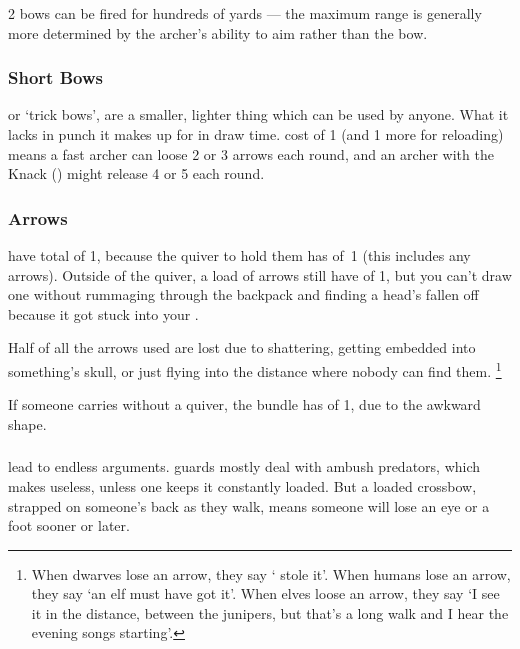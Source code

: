 \begin{multicols}{2}
\Glspl{bow} can be fired for hundreds of yards --- the maximum range is generally more determined by the archer's ability to aim rather than the bow.

\subsubsection{Short Bows}
or `trick bows', are a smaller, lighter thing which can be used by anyone.
What it lacks in punch it makes up for in draw time.
 cost of 1 (and 1 more for reloading) means a fast archer can loose 2 or 3 arrows each \gls{round}, and an archer with the  Knack () might release 4 or 5 each \gls{round}.

\throwGoblinCommentary[t]

\subsubsection{Arrows}
have  total of 1, because the quiver to hold them has  of~1 (this includes any arrows).
Outside of the quiver, a load of arrows still have  of 1, but you can't draw one without rummaging through the backpack and finding a head's fallen off because it got stuck into your \rations.

Half of all the arrows used are lost due to shattering, getting embedded into something's skull, or just flying into the distance where nobody can find them.%
\footnote{When dwarves lose an arrow, they say ` stole it'.
When humans lose an arrow, they say `an elf must have got it'.
When elves loose an arrow, they say `I see it in the distance, between the junipers, but that's a long walk and I hear the evening songs starting'.}

If someone carries without a quiver, the bundle has  of 1, due to the awkward shape.

\subsubsection{}
\label{crossbow}
lead to endless arguments.
\Glspl{guard} mostly deal with ambush predators, which makes  useless, unless one keeps it constantly loaded.
But a loaded \gls{crossbow}, strapped on someone's back as they walk, means someone will lose an eye or a foot sooner or later.


\end{multicols}
